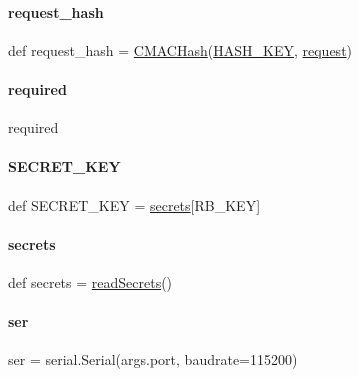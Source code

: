 \mbox{\label{namespacereadback_ab9bf3a2a626c2e1065571afbbfd14afb}} 
\paragraph{\texorpdfstring{request\+\_\+hash}{request\_hash}}
{\footnotesize\ttfamily def request\+\_\+hash = \hyperlink{namespacereadback_a4060e3a940d166a7303d3327c2d6d2c7}{C\+M\+A\+C\+Hash}(\hyperlink{namespacereadback_a35a9a34ee7518a921d8160de0d047582}{H\+A\+S\+H\+\_\+\+K\+EY}, \hyperlink{namespacereadback_a7ea72716d3813b3d175a880ff91eca73}{request})}

\mbox{\label{namespacereadback_ae81948490ddf54e80a22593640178350}} 
\paragraph{\texorpdfstring{required}{required}}
{\footnotesize\ttfamily required}

\mbox{\label{namespacereadback_a02f2277a7bdf9af309a578b94b663182}} 
\paragraph{\texorpdfstring{S\+E\+C\+R\+E\+T\+\_\+\+K\+EY}{SECRET\_KEY}}
{\footnotesize\ttfamily def S\+E\+C\+R\+E\+T\+\_\+\+K\+EY = \hyperlink{namespacereadback_a7ef58b6350bb8f1ea4b81d24cac72a55}{secrets}\mbox{[}\textquotesingle{}R\+B\+\_\+\+K\+EY\textquotesingle{}\mbox{]}}

\mbox{\label{namespacereadback_a7ef58b6350bb8f1ea4b81d24cac72a55}} 
\paragraph{\texorpdfstring{secrets}{secrets}}
{\footnotesize\ttfamily def secrets = \hyperlink{namespacereadback_a7e694d4aa4ee2fc3c68862d4c30379e5}{read\+Secrets}()}

\mbox{\label{namespacereadback_a5b7028344d79661ed4abe535b0e7e307}} 
\paragraph{\texorpdfstring{ser}{ser}}
{\footnotesize\ttfamily ser = serial.\+Serial(args.\+port, baudrate=115200)}

